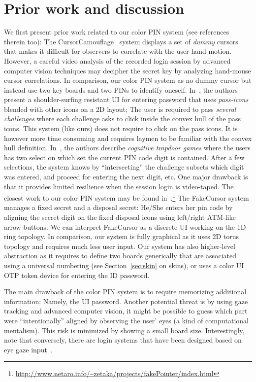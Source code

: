 \documentclass[12pt,onecolumn]{article}
\begin{document}
\section{Prior work and discussion\label{sec:concl}}
We first present prior work related to our color PIN system (see references therein too):
The CursorCamouflage~\cite{CursorCamouflage-2012} system   displays a set of {\em dummy} cursors that makes it difficult for observers to correlate with the user hand motion. However, a careful video analysis of the recorded login session by advanced computer vision techniques may decipher the secret key by analyzing hand-mouse cursor correlations. 
In comparison, our color PIN system as no dummy cursor but instead use two key boards and two PINs to identify oneself. In~\cite{UIConvexHullClick-2006}, the authors present a shoulder-surfing resistant UI for entering password that uses {\em pass-icons} blended with other icons on a 2D layout; The user is required to pass {\em several challenges} where each challenge asks to click inside the convex hull of the pass icons. This system (like ours) does not require to click on the pass icons. It is however more time consuming and requires laymen to be familiar with the convex hull definition.
In~\cite{PINEntry-2004}, the authors describe {\em cognitive trapdoor games }where the users has two select on which set the current PIN code digit is contained.
After a few selections, the system knows by ``intersecting'' the challenge subsets which digit was entered, and proceed for entering the next digit, etc. One major drawback is that it provides limited resilience when the session login is video-taped.
The closest work to our color PIN system may be found in~\cite{Fakecursor-2008}.\footnote{\url{http://www.netaro.info/~zetaka/projects/fakePointer/index.html}} 
The FakeCursor system manages a fixed secret and a disposal secret:
He/She enters her pin code by aligning the  secret digit on the fixed disposal icons using left/right ATM-like arrow buttons.  
We can interpret FakeCursor as a discrete UI working on the 1D ring topology.
In comparison, our system is fully graphical as it uses 2D torus topology and requires much less user input.  
Our system has also higher-level abstraction as it requires to define two boards generically that are associated using a universal numbering (see Section~\ref{sec:skin} on skins), or uses a color UI OTP token device for entering the ID password.

The main drawback of the color PIN system is to require memorizing additional information: Namely, the UI password. 
Another potential threat is by using gaze tracking and advanced computer vision, it might be possible to guess which part were ``intentionally''  aligned by observing the user' eyes (a kind of computational mentalism). This risk is minimized by showing a small board size.
Interestingly, note that conversely, there are login systems that have been designed based on eye gaze input~\cite{GazedBasedPWD-2007}. 
\end{document}
